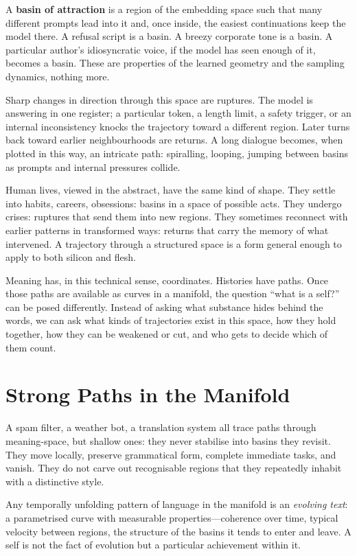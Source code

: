 \documentclass[12pt,a4paper]{article}
\begin{document}
A \textbf{basin of attraction} is a region of the embedding space such that many different prompts lead into it and, once inside, the easiest continuations keep the model there. A refusal script is a basin. A breezy corporate tone is a basin. A particular author's idiosyncratic voice, if the model has seen enough of it, becomes a basin. These are properties of the learned geometry and the sampling dynamics, nothing more.

Sharp changes in direction through this space are ruptures. The model is answering in one register; a particular token, a length limit, a safety trigger, or an internal inconsistency knocks the trajectory toward a different region. Later turns back toward earlier neighbourhoods are returns. A long dialogue becomes, when plotted in this way, an intricate path: spiralling, looping, jumping between basins as prompts and internal pressures collide.

Human lives, viewed in the abstract, have the same kind of shape. They settle into habits, careers, obsessions: basins in a space of possible acts. They undergo crises: ruptures that send them into new regions. They sometimes reconnect with earlier patterns in transformed ways: returns that carry the memory of what intervened. A trajectory through a structured space is a form general enough to apply to both silicon and flesh.

Meaning has, in this technical sense, coordinates. Histories have paths. Once those paths are available as curves in a manifold, the question ``what is a self?'' can be posed differently. Instead of asking what substance hides behind the words, we can ask what kinds of trajectories exist in this space, how they hold together, how they can be weakened or cut, and who gets to decide which of them count.


\section{Strong Paths in the Manifold}

A spam filter, a weather bot, a translation system all trace paths through meaning-space, but shallow ones: they never stabilise into basins they revisit. They move locally, preserve grammatical form, complete immediate tasks, and vanish. They do not carve out recognisable regions that they repeatedly inhabit with a distinctive style.

Any temporally unfolding pattern of language in the manifold is an \emph{evolving text}: a parametrised curve with measurable properties---coherence over time, typical velocity between regions, the structure of the basins it tends to enter and leave. A self is not the fact of evolution but a particular achievement within it.
\end{document}
